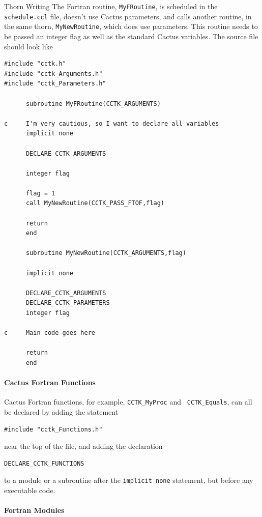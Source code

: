 \begin{cactuspart}{Thorn Writing}
The Fortran routine, \verb|MyFRoutine|, is scheduled in the {\tt
schedule.ccl} file, doesn't use Cactus parameters, and calls another
routine, in the same thorn, \verb|MyNewRoutine|, which does use
parameters.  This routine needs to be passed an integer flag as well
as the standard Cactus variables. The source file should look like
%
\begin{verbatim}
#include "cctk.h"
#include "cctk_Arguments.h"
#include "cctk_Parameters.h"

      subroutine MyFRoutine(CCTK_ARGUMENTS)

c     I'm very cautious, so I want to declare all variables
      implicit none

      DECLARE_CCTK_ARGUMENTS

      integer flag

      flag = 1
      call MyNewRoutine(CCTK_PASS_FTOF,flag)

      return
      end

      subroutine MyNewRoutine(CCTK_ARGUMENTS,flag)

      implicit none

      DECLARE_CCTK_ARGUMENTS
      DECLARE_CCTK_PARAMETERS
      integer flag

c     Main code goes here

      return
      end

\end{verbatim}

\paragraph{Cactus Fortran Functions}

Cactus Fortran functions, for example, \texttt{CCTK\_MyProc} and {\tt
CCTK\_Equals}, can all be declared by adding the statement
%
\begin{verbatim}
#include "cctk_Functions.h"
\end{verbatim}
%
near the top of the file, and adding the declaration
%
\begin{verbatim}
DECLARE_CCTK_FUNCTIONS
\end{verbatim}
%
to a module or a subroutine after the \texttt{implicit none}
statement, but before any executable code.

\paragraph{Fortran Modules}
\label{par:fortran_modules}


\end{cactuspart}

